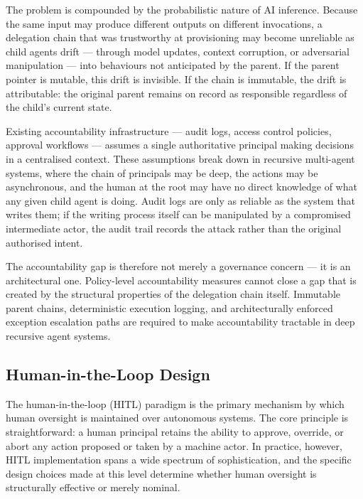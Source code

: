 The problem is compounded by the probabilistic nature of AI inference. Because the same input may produce different outputs on different invocations, a delegation chain that was trustworthy at provisioning may become unreliable as child agents drift — through model updates, context corruption, or adversarial manipulation — into behaviours not anticipated by the parent. If the parent pointer is mutable, this drift is invisible. If the chain is immutable, the drift is attributable: the original parent remains on record as responsible regardless of the child's current state.

Existing accountability infrastructure — audit logs, access control policies, approval workflows — assumes a single authoritative principal making decisions in a centralised context. These assumptions break down in recursive multi-agent systems, where the chain of principals may be deep, the actions may be asynchronous, and the human at the root may have no direct knowledge of what any given child agent is doing. Audit logs are only as reliable as the system that writes them; if the writing process itself can be manipulated by a compromised intermediate actor, the audit trail records the attack rather than the original authorised intent.

The accountability gap is therefore not merely a governance concern — it is an architectural one. Policy-level accountability measures cannot close a gap that is created by the structural properties of the delegation chain itself. Immutable parent chains, deterministic execution logging, and architecturally enforced exception escalation paths are required to make accountability tractable in deep recursive agent systems.

\subsection{Human-in-the-Loop Design}
\label{sec:hitl}

The human-in-the-loop (HITL) paradigm is the primary mechanism by which human oversight is maintained over autonomous systems. The core principle is straightforward: a human principal retains the ability to approve, override, or abort any action proposed or taken by a machine actor. In practice, however, HITL implementation spans a wide spectrum of sophistication, and the specific design choices made at this level determine whether human oversight is structurally effective or merely nominal.

